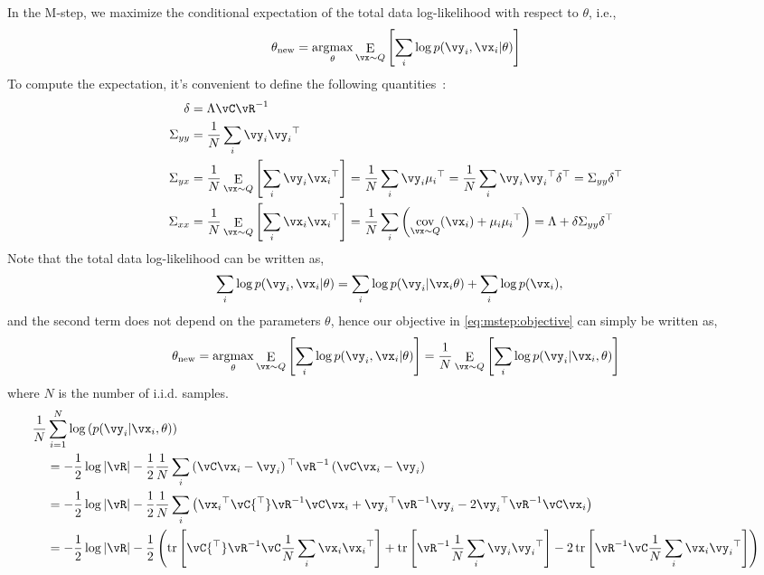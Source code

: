 \documentclass{article}
\DeclareMathOperator*{\E}{\rm E}
\DeclareMathOperator*{\cov}{cov}
\DeclareMathOperator*{\argmax}{\rm argmax}
\DeclareMathOperator{\tr}{tr}
\newcommand{\trp}{{^\top}} %
\newcommand{\inv}{^{-1}}
\newcommand{\oneHalf}{\frac{1}{2}}
\newcounter{ct}
\begin{document}
In the M-step, we maximize the conditional expectation of the total data
log-likelihood with respect to $\theta$, i.e.,
\begin{align}\label{eq:mstep:objective}
    \theta_{\mathrm{new}} =
	\argmax_\theta
	\E_{\vx\sim Q}
	    \left[
		\sum_i \log
		    p(\vy_i, \vx_i|\theta)
	    \right]
\end{align}
To compute the expectation, it's convenient to define the following quantities~\cite{Rubin1982}:
\begin{align}
    \delta &= \Lambda \vC \vR\inv\\
    \Sigma_{yy} &= \frac{1}{N}\sum_i \vy_i \vy_i\trp\\
    \Sigma_{yx} &= \frac{1}{N}\E_{\vx \sim Q} \left[ \sum_i \vy_i \vx_i\trp \right]
	= \frac{1}{N}\sum_i \vy_i \mu_i\trp
	= \frac{1}{N}\sum_i \vy_i \vy_i\trp \delta\trp
	= \Sigma_{yy} \delta\trp\\
    \Sigma_{xx} &= \frac{1}{N}\E_{\vx \sim Q} \left[ \sum_i \vx_i \vx_i\trp \right]
	= \frac{1}{N} \sum_i 
	    \left(
		\cov_{\vx\sim Q}(\vx_i) + \mu_i\mu_i\trp
	    \right)
	= \Lambda + \delta\Sigma_{yy}\delta\trp
\end{align}
Note that the total data log-likelihood can be written as,
\begin{align}
    \sum_i \log p(\vy_i, \vx_i|\theta) 
    &=
    \sum_i \log p(\vy_i| \vx_i\theta) 
    +
    \sum_i \log p(\vx_i),
\end{align}
and the second term does not depend on the parameters $\theta$, hence
our objective in \eqref{eq:mstep:objective} can simply be written as,
\begin{align}
\theta_{\mathrm{new}} =
    \argmax_\theta
    \E_{\vx\sim Q}
	\left[
	    \sum_i \log
		p(\vy_i, \vx_i|\theta)
	\right] =
\frac{1}{N}\E_{\vx\sim Q}
    \left[
	\sum_i \log
	    p(\vy_i| \vx_i, \theta)
    \right]
\end{align}
where $N$ is the number of i.i.d. samples.
\begin{align*}
\frac{1}{N} & \sum_{i=1}^N \log\left(
	p(\vy_i| \vx_i, \theta)
    \right)
    \nonumber\\
    &=
    -\oneHalf \log |\vR|
    -\oneHalf 
    \frac{1}{N}
    \sum_i
	\left(\vC \vx_i - \vy_i\right)\trp
	\vR\inv
	\left(\vC \vx_i - \vy_i\right)
    \\
    &=
    -\oneHalf \log |\vR|
    -\oneHalf 
    \frac{1}{N}
    \sum_i
	\left(
	    \vx_i\trp\vC\trp \vR\inv \vC \vx_i
	    +\vy_i\trp \vR\inv \vy_i
	    -2\vy_i\trp \vR\inv \vC \vx_i
	\right)
    \\
    &=
    -\oneHalf \log |\vR|
    -\oneHalf 
	\left(
	    \tr\left[
		\vC\trp \vR\inv \vC 
		\frac{1}{N} \sum_i
		    \vx_i\vx_i\trp
	    \right]
	    +
	    \tr\left[
		\vR\inv 
		\frac{1}{N} \sum_i
		    \vy_i \vy_i\trp 
	    \right]
	    -
	    2\tr\left[
		\vR\inv \vC 
		\frac{1}{N} \sum_i
		    \vx_i \vy_i\trp 
	    \right]
	\right)
\end{align*}
\end{document}
